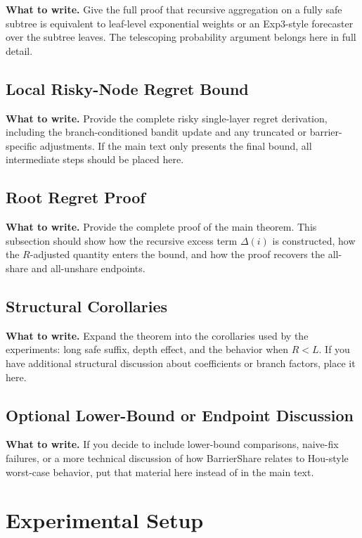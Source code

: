 \documentclass{article}
\newcommand{\towrite}[1]{\noindent\textbf{What to write.} #1}
\begin{document}
\towrite{Give the full proof that recursive aggregation on a fully safe subtree is equivalent to leaf-level exponential weights or an Exp3-style forecaster over the subtree leaves. The telescoping probability argument belongs here in full detail.}

\subsection{Local Risky-Node Regret Bound}

\towrite{Provide the complete risky single-layer regret derivation, including the branch-conditioned bandit update and any truncated or barrier-specific adjustments. If the main text only presents the final bound, all intermediate steps should be placed here.}

\subsection{Root Regret Proof}

\towrite{Provide the complete proof of the main theorem. This subsection should show how the recursive excess term $\Delta(i)$ is constructed, how the $R$-adjusted quantity enters the bound, and how the proof recovers the all-share and all-unshare endpoints.}

\subsection{Structural Corollaries}

\towrite{Expand the theorem into the corollaries used by the experiments: long safe suffix, depth effect, and the behavior when $R<L$. If you have additional structural discussion about coefficients or branch factors, place it here.}

\subsection{Optional Lower-Bound or Endpoint Discussion}

\towrite{If you decide to include lower-bound comparisons, naive-fix failures, or a more technical discussion of how BarrierShare relates to Hou-style worst-case behavior, put that material here instead of in the main text.}

\section{Experimental Setup}
\end{document}
